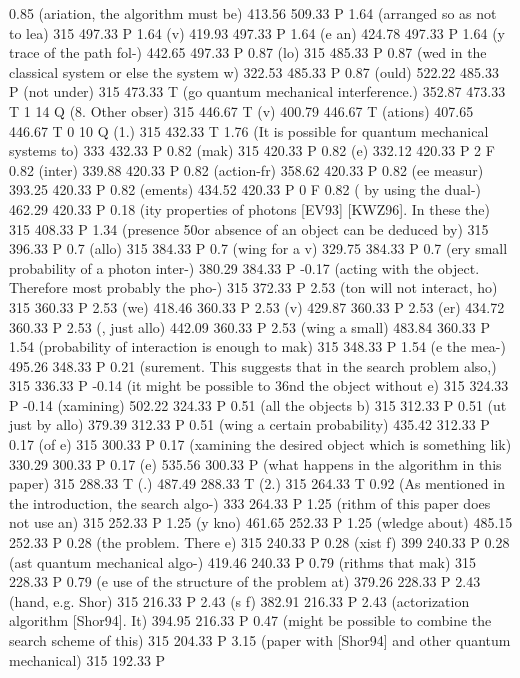 0.85 (ariation, the algorithm must be) 413.56 509.33 P
1.64 (arranged so as not to lea) 315 497.33 P
1.64 (v) 419.93 497.33 P
1.64 (e an) 424.78 497.33 P
1.64 (y trace of the path fol-) 442.65 497.33 P
0.87 (lo) 315 485.33 P
0.87 (wed in the classical system or else the system w) 322.53 485.33 P
0.87 (ould) 522.22 485.33 P
(not under) 315 473.33 T
(go quantum mechanical interference.) 352.87 473.33 T
1 14 Q
(8. Other obser) 315 446.67 T
(v) 400.79 446.67 T
(ations) 407.65 446.67 T
0 10 Q
(1.) 315 432.33 T
1.76 (It is possible for quantum mechanical systems to) 333 432.33 P
0.82 (mak) 315 420.33 P
0.82 (e) 332.12 420.33 P
2 F
0.82 (inter) 339.88 420.33 P
0.82 (action-fr) 358.62 420.33 P
0.82 (ee measur) 393.25 420.33 P
0.82 (ements) 434.52 420.33 P
0 F
0.82 ( by using the dual-) 462.29 420.33 P
0.18 (ity properties of photons [EV93] [KWZ96]. In these the) 315 408.33 P
1.34 (presence \050or absence of an object can be deduced by) 315 396.33 P
0.7 (allo) 315 384.33 P
0.7 (wing for a v) 329.75 384.33 P
0.7 (ery small probability of a photon inter-) 380.29 384.33 P
-0.17 (acting with the object. Therefore most probably the pho-) 315 372.33 P
2.53 (ton will not interact, ho) 315 360.33 P
2.53 (we) 418.46 360.33 P
2.53 (v) 429.87 360.33 P
2.53 (er) 434.72 360.33 P
2.53 (, just allo) 442.09 360.33 P
2.53 (wing a small) 483.84 360.33 P
1.54 (probability of interaction is enough to mak) 315 348.33 P
1.54 (e the mea-) 495.26 348.33 P
0.21 (surement. This suggests that in the search problem also,) 315 336.33 P
-0.14 (it might be possible to \336nd the object without e) 315 324.33 P
-0.14 (xamining) 502.22 324.33 P
0.51 (all the objects b) 315 312.33 P
0.51 (ut just by allo) 379.39 312.33 P
0.51 (wing a certain probability) 435.42 312.33 P
0.17 (of e) 315 300.33 P
0.17 (xamining the desired object which is something lik) 330.29 300.33 P
0.17 (e) 535.56 300.33 P
(what happens in the algorithm in this paper) 315 288.33 T
(.) 487.49 288.33 T
(2.) 315 264.33 T
0.92 (As mentioned in the introduction, the search algo-) 333 264.33 P
1.25 (rithm of this paper does not use an) 315 252.33 P
1.25 (y kno) 461.65 252.33 P
1.25 (wledge about) 485.15 252.33 P
0.28 (the problem. There e) 315 240.33 P
0.28 (xist f) 399 240.33 P
0.28 (ast quantum mechanical algo-) 419.46 240.33 P
0.79 (rithms that mak) 315 228.33 P
0.79 (e use of the structure of the problem at) 379.26 228.33 P
2.43 (hand, e.g. Shor) 315 216.33 P
2.43 (s f) 382.91 216.33 P
2.43 (actorization algorithm [Shor94]. It) 394.95 216.33 P
0.47 (might be possible to combine the search scheme of this) 315 204.33 P
3.15 (paper with [Shor94] and other quantum mechanical) 315 192.33 P
